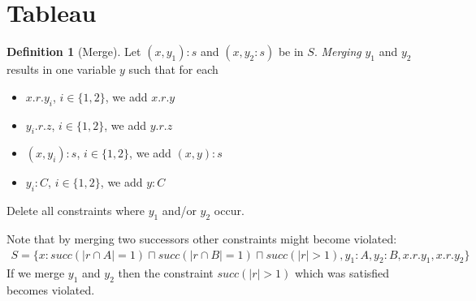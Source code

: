 \documentclass[a4paper,11pt]{scrartcl}
\theoremstyle{definition}
\newtheorem{mydef}{Definition}
\begin{document}
\section{Tableau}
\begin{mydef}[Merge]
Let $(x,y_1):s$ and $(x,y_2:s)$ be in $S$. \textit{Merging} $y_1$ and $y_2$ results in one variable $y$ such that for each
\begin{itemize}
\item $x.r.y_i$, $i\in\{1,2\}$, we add $x.r.y$
\item $y_i.r.z$, $i\in\{1,2\}$, we add $y.r.z$
\item $(x,y_i):s$, $i\in\{1,2\}$, we add $(x,y):s$
\item $y_i:C$, $i\in\{1,2\}$, we add $y:C$
\end{itemize}
Delete all constraints where $y_1$ and/or $y_2$ occur.
\end{mydef}
Note that by merging two successors other constraints might become violated:
\begin{align*}
S=\{x:succ(|r\cap A|=1)\sqcap succ(|r\cap B|=1)\sqcap succ(|r|>1), y_1:A, y_2:B, x.r.y_1, x.r.y_2\}
\end{align*}
If we merge $y_1$ and $y_2$ then the constraint $succ(|r|>1)$ which was satisfied becomes violated.\\
\end{document}
